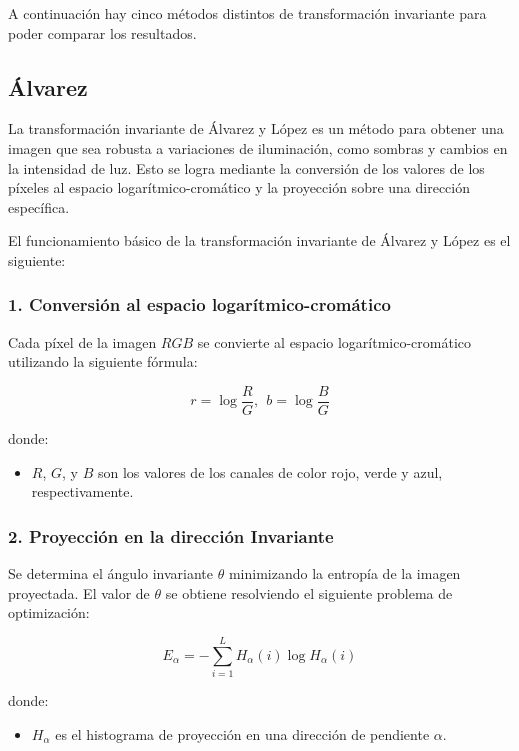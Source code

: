 A continuación hay cinco métodos distintos de transformación invariante para poder comparar los resultados.

\subsection{Álvarez}\label{alvarez}
La transformación invariante de Álvarez y López \cite{alvarez2011} es un método para obtener una imagen que sea robusta a variaciones de iluminación, como sombras y cambios en la intensidad de luz. Esto se logra mediante la conversión de los valores de los píxeles al espacio logarítmico-cromático y la proyección sobre una dirección específica.

El funcionamiento básico de la transformación invariante de Álvarez y López es el siguiente:

\subsubsection{1. Conversión al espacio logarítmico-cromático}

Cada píxel de la imagen $RGB$ se convierte al espacio logarítmico-cromático utilizando la siguiente fórmula:

$$r=\log \frac{R}{G},~~b=\log \frac{B}{G}$$

donde:

\begin{itemize}
\setlength{\itemsep}{-1ex}
   \item{\begin{flushleft} $R$, $G$, y $B$ son los valores de los canales de color rojo, verde y azul, respectivamente. \end{flushleft}}
\end{itemize}

\subsubsection{2. Proyección en la dirección Invariante}

Se determina el ángulo invariante $\theta$ minimizando la entropía de la imagen proyectada. El valor de $\theta$ se obtiene resolviendo el siguiente problema de optimización:

$$E_{\alpha } =-\sum_{i=1}^L H_{\alpha } (i)\log H_{\alpha } (i)$$

donde:

\begin{itemize}
\setlength{\itemsep}{-1ex}
   \item{\begin{flushleft} $H_{\alpha }$ es el histograma de proyección en una dirección de pendiente $\alpha$. \end{flushleft}}
\end{itemize}

